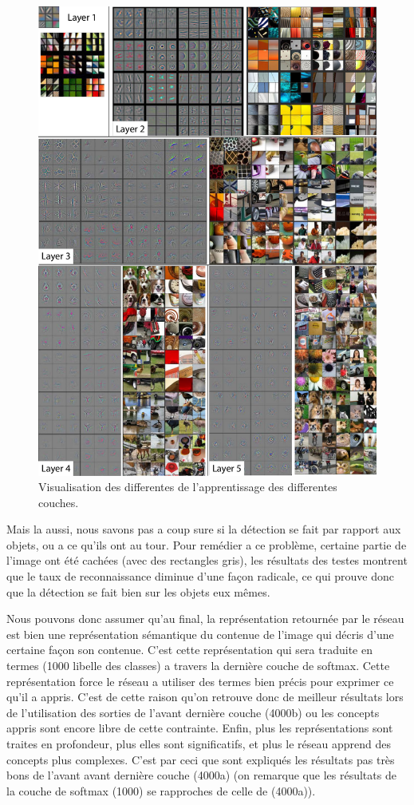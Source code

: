 \begin{figure}[H]
	\centering
		\includegraphics[width=5in]{Figures/visualisation.png}
	\caption[Res]{Visualisation des differentes de l'apprentissage des differentes couches.}
	\label{fig:Electron}
\end{figure}

Mais la aussi, nous savons pas a coup sure si la détection se fait par rapport aux objets, ou a ce qu'ils ont au tour. Pour remédier a ce problème, certaine partie de l'image ont été cachées (avec des rectangles gris), les résultats des testes montrent que le taux de reconnaissance diminue d'une façon radicale, ce qui prouve donc que la détection se fait bien sur les objets eux mêmes.

Nous pouvons donc assumer qu'au final, la représentation retournée par le réseau est bien une représentation sémantique du contenue de l'image qui décris d'une certaine façon son contenue. C'est cette représentation qui sera traduite en termes (1000 libelle des classes) a travers la dernière couche de softmax. Cette représentation force le réseau a utiliser des termes bien précis pour exprimer ce qu'il a appris. C'est de cette raison qu'on retrouve donc de meilleur résultats lors de l'utilisation des sorties de l'avant dernière couche (4000b) ou les concepts appris sont encore libre de cette contrainte. Enfin, plus les représentations sont traites en profondeur, plus elles sont significatifs, et plus le réseau apprend des concepts plus complexes. C'est par ceci que sont expliqués les résultats pas très bons de l'avant avant dernière couche (4000a) (on remarque que les résultats de la couche de softmax (1000) se rapproches de celle de (4000a)).

